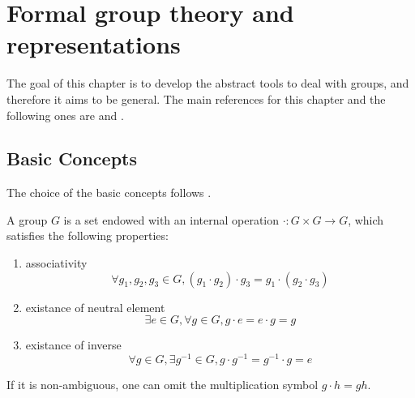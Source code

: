 \chapter{Formal group theory and representations}
The goal of this chapter is to develop the abstract tools to deal with groups, and therefore it aims to be general.
The main references for this chapter and the following ones are \cite{Barone2004} and \cite{Tung1985}.


\section{Basic Concepts}

The choice of the basic concepts follows \cite{Barone2004}.

\begin{definition}[Group]
    A group $G$ is a set endowed with an internal operation $\cdot: G \times G \rightarrow G$, which satisfies the following properties:
    \begin{enumerate}
        \item associativity
        \begin{equation}
            \forall g_1, g_2, g_3 \in G, (g_1 \cdot g_2) \cdot g_3 = g_1 \cdot (g_2 \cdot g_3)
            \label{eq:group_associativity}
        \end{equation}
        \item existance of neutral element
        \begin{equation}
            \exists e \in G, \forall g \in G, g\cdot e = e\cdot g = g
            \label{eq:group_neutral}
        \end{equation}
        \item existance of inverse
        \begin{equation}
            \forall g \in G, \exists g^{-1} \in G, g \cdot g^{-1} = g^{-1} \cdot g = e
            \label{eq:group_inverse}
        \end{equation}
    \end{enumerate}
\end{definition}
If it is non-ambiguous, one can omit the multiplication symbol $g \cdot h = gh$.

